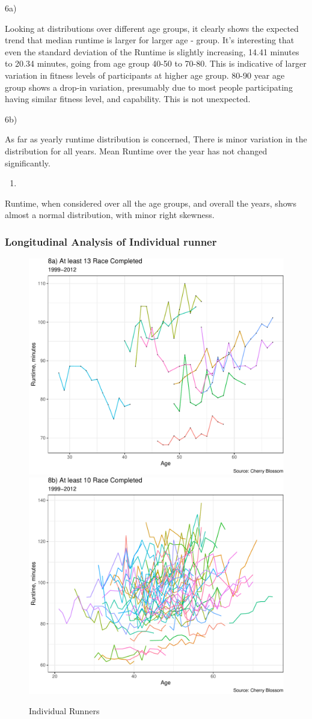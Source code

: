 \documentclass[
]{article}
\providecommand{\tightlist}{%
  \setlength{\itemsep}{0pt}\setlength{\parskip}{0pt}}
\begin{document}
6a)

Looking at distributions over different age groups, it clearly shows the
expected trend that median runtime is larger for larger age - group.
It's interesting that even the standard deviation of the Runtime is
slightly increasing, 14.41 minutes to 20.34 minutes, going from age
group 40-50 to 70-80. This is indicative of larger variation in fitness
levels of participants at higher age group. 80-90 year age group shows a
drop-in variation, presumably due to most people participating having
similar fitness level, and capability. This is not unexpected.

6b)

As far as yearly runtime distribution is concerned, There is minor
variation in the distribution for all years. Mean Runtime over the year
has not changed significantly.

\begin{enumerate}
\def\labelenumi{\arabic{enumi})}
\setcounter{enumi}{6}
\tightlist
\item
\end{enumerate}

Runtime, when considered over all the age groups, and overall the years,
shows almost a normal distribution, with minor right skewness.

\hypertarget{longitudinal-analysis-of-individual-runner}{%
\subsubsection{Longitudinal Analysis of Individual
runner}\label{longitudinal-analysis-of-individual-runner}}

\begin{figure}[H]

\includegraphics[width=.49\linewidth,]{case_study02_files/figure-latex/unnamed-chunk-16-1} \includegraphics[width=.49\linewidth,]{case_study02_files/figure-latex/unnamed-chunk-16-2} \hfill{}

\caption{Individual Runners}\label{fig:unnamed-chunk-16}
\end{figure}
\end{document}
